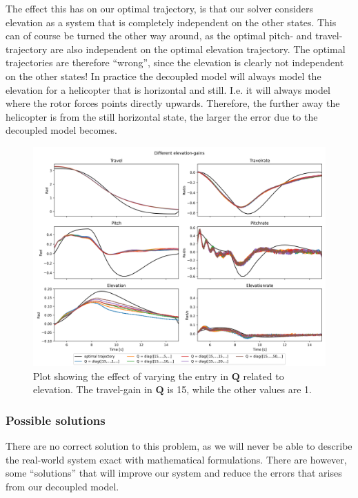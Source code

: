 \documentclass[../main.tex]{subfiles}
\begin{document}
The effect this has on our optimal trajectory, is that our solver considers elevation as a system that is completely independent on the other states. This can of course be turned the other way around, as the optimal pitch- and travel-trajectory are also independent on the optimal elevation trajectory. The optimal trajectories are therefore ``wrong'', since the elevation is clearly not independent on the other states! In practice the decoupled model will always model the elevation for a helicopter that is horizontal and still. I.e. it will always model where the rotor forces points directly upwards. Therefore, the further away the helicopter is from the still horizontal state, the larger the error due to the decoupled model becomes. 
\begin{figure}[h]
	\centering
	\includegraphics[width=\linewidth]{figures/LAB4_elevation_gains.png}
	\caption{Plot showing the effect of varying the entry in $ \bm Q $ related to elevation. The travel-gain in $ \bm Q $ is 15, while the other values are 1.}
	\label{fig:lab4_diff_elevation_values}
\end{figure}

\subsubsection{Possible solutions}
There are no correct solution to this problem, as we will never be able to describe the real-world system exact with mathematical formulations. There are however, some ``solutions'' that will improve our system and reduce the errors that arises from our decoupled model.
\end{document}

